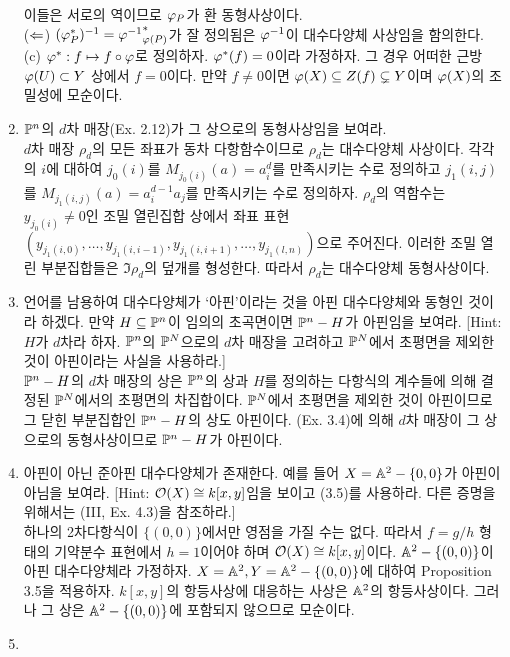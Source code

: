 \begin{enumerate}[label=\tb{3.\arabic*.},itemindent=0mm,itemsep=4mm]
		이들은 서로의 역이므로 $\varphi_P$가 환 동형사상이다.\\
		($\Leftarrow$) $(\varphi_P^*)^{-1}={\varphi^{-1}}_{\varphi(P)}^*$가 잘 정의됨은 $\varphi^{-1}$이 대수다양체 사상임을 함의한다.\\
		(c) $\varphi^*:f\mapsto f\circ\varphi$로 정의하자. $\varphi^*(f)=0$이라 가정하자. 그 경우 어떠한 근방 $\varphi(U)\subset Y$ 상에서 $f=0$이다.
		만약 $f\ne 0$이면 $\varphi(X)\subseteq Z(f)\subsetneq Y$이며 $\varphi(X)$의 조밀성에 모순이다.
		\item $\mathbb{P}^n$의 $d$차 매장(Ex. 2.12)가 그 상으로의 동형사상임을 보여라.\\
		\sol $d$차 매장 $\rho_d$의 모든 좌표가 동차 다항함수이므로 $\rho_d$는 대수다양체 사상이다.
		각각의 $i$에 대하여 $j_0(i)$를 $M_{j_0(i)}(a)=a_i^d$를 만족시키는 수로 정의하고
		$j_1(i,j)$를 $M_{j_1(i,j)}(a)=a_i^{d-1}a_j$를 만족시키는 수로 정의하자.
		$\rho_d$의 역함수는 $y_{j_0(i)}\ne 0$인 조밀 열린집합 상에서 좌표 표현\\
		$(y_{j_1(i,0)},\ldots,y_{j_1(i,i-1)},y_{j_1(i,i+1)},\ldots,y_{j_1(l,n)})$으로 주어진다.
		이러한 조밀 열린 부분집합들은 $\Im\rho_d$의 덮개를 형성한다. 따라서 $\rho_d$는 대수다양체 동형사상이다.
		\item 언어를 남용하여 대수다양체가 `아핀'이라는 것을 아핀 대수다양체와 동형인 것이라 하겠다.
		만약 $H\subseteq\mathbb{P}^n$이 임의의 초곡면이면 $\mathbb{P}^n-H$가 아핀임을 보여라. [Hint: $H$가 $d$차라 하자.
		$\mathbb{P}^n$의 $\mathbb{P}^N$으로의 $d$차 매장을 고려하고 $\mathbb{P}^N$에서 초평면을 제외한 것이 아핀이라는 사실을 사용하라.]\\
		\sol $\mathbb{P}^n-H$의 $d$차 매장의 상은 $\mathbb{P}^n$의 상과 $H$를 정의하는 다항식의 계수들에 의해 결정된 $\mathbb{P}^N$에서의 초평면의 차집합이다.
		$\mathbb{P}^N$에서 초평면을 제외한 것이 아핀이므로 그 닫힌 부분집합인 $\mathbb{P}^n-H$의 상도 아핀이다.
		(Ex. 3.4)에 의해 $d$차 매장이 그 상으로의 동형사상이므로 $\mathbb{P}^n-H$가 아핀이다.
		\item 아핀이 아닌 준아핀 대수다양체가 존재한다. 예를 들어 $X=\mathbb{A}^2-\{0,0\}$가 아핀이 아님을 보여라.
		[Hint: $\mathcal{O}(X)\cong k[x,y]$임을 보이고 (3.5)를 사용하라. 다른 증명을 위해서는 (III, Ex. 4.3)을 참조하라.]\\
		\sol 하나의 2차다항식이 $\{(0,0)\}$에서만 영점을 가질 수는 없다.
		따라서 $f=g/h$ 형태의 기약분수 표현에서 $h=1$이어야 하며 $\mathcal{O}(X)\cong k[x,y]$이다.
		$\mathbb{A}^2-\{(0,0)\}$이 아핀 대수다양체라 가정하자. $X=\mathbb{A}^2,Y=\mathbb{A}^2-\{(0,0)\}$에 대하여 Proposition 3.5을 적용하자.
		$k[x,y]$의 항등사상에 대응하는 사상은 $\mathbb{A}^2$의 항등사상이다.
		그러나 그 상은 $\mathbb{A}^2-\{(0,0)\}$에 포함되지 않으므로 모순이다.
		\item \begin{enumerate}[label=(\alph*)]

\end{enumerate}
\end{enumerate}
